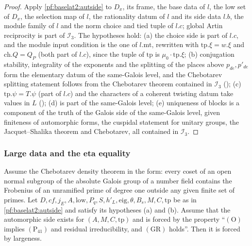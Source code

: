 \begin{proof}
Apply \cref{pf:baselat2:autside} to $D_x$, its frame, the base data of $l$, the low set of $D_x$, the
selection map of $l$, the rationality datum of $l$ and its side data $l.b$, the module family of $l$ and the
norm choice and tied tuple of $l.c$; global Artin reciprocity is part of $\mathcal I_3$. The hypotheses hold:
(a) the choice side is part of $l.c$, and the module input condition is the one of $l.\mathrm{mt}$, rewritten with
$\mathrm{tp}.\xi=w.\xi$ and $\mathrm{ch}.Q=Q_P$ (both part of $l.c$), since the tuple of $\mathrm{tp}$ is $\mu_0\cdot\mathrm{tp}.\xi$;
(b) conjugation stability, integrality of the exponents and the splitting of the places above $p_{de},p'_{de}$
form the elementary datum of the same-Galois level, and the Chebotarev splitting statement follows from the
Chebotarev theorem contained in $\mathcal I_3$ ();
(c) $\mathrm{tp}.\psi=T.\psi$ (part of $l.c$) and the characters of a coherent twisting datum take values in $L$
(); (d) is part of the same-Galois level; (e) uniqueness of blocks
is a component of the truth of the Galois side of the same-Galois level, given finiteness of automorphic
forms, the cuspidal statement for unitary groups, the Jacquet--Shalika theorem and Chebotarev, all
contained in $\mathcal I_3$.
\end{proof}

\subsubsection{Large data and the eta equality}

\begin{proposition}\label{pf:baselat2:large}
Assume the Chebotarev density theorem in the form: every coset of an open normal subgroup of the
absolute Galois group of a number field contains the Frobenius of an unramified prime of degree one
outside any given finite set of primes. Let $D,cf,j_E,A,\mathrm{low},P_q,S,h'_L,\mathrm{eig},\theta,B_s,M,C,\mathrm{tp}$ be
as in \cref{pf:baselat2:autside} and satisfy its hypotheses (a) and (b). Assume that the automorphic side
exists for $(A,M,C,\mathrm{tp})$ and is forced by the property
``$(\mathrm{O})$ implies $(\mathrm{P}_{41})$ and residual irreducibility, and $(\mathrm{GR})$ holds''.
Then it is forced by largeness.
\end{proposition}

